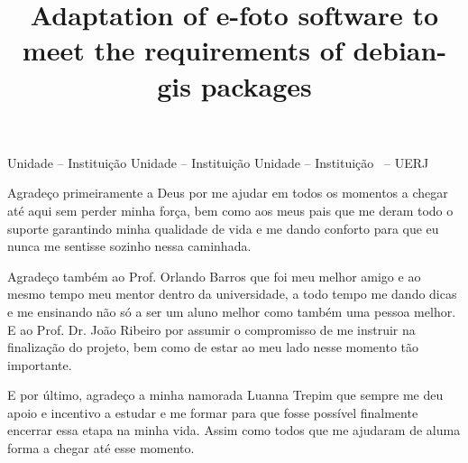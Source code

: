 \documentclass[a4paper,12pt,oneside,onecolumn,final,fleqn]{repUERJ}
\title{Adaptation of e-foto software to meet the requirements of debian-gis packages}
\begin{document}
	
	\frontmatter %
	
	\capa
	\folhaderosto
	\fichacatalografica{}
	\begin{folhadeaprovacao}
		{Unidade -- Instituição}
		{Unidade -- Instituição}
		{Unidade -- Instituição}
		{\UERJunidade \UERJunidadenome\ -- UERJ}
	\end{folhadeaprovacao}
	
	Agradeço primeiramente a Deus por me ajudar em todos os momentos a chegar até aqui sem perder minha força, bem como aos meus pais que me deram todo o suporte garantindo minha qualidade de vida e me dando conforto para que eu nunca me sentisse sozinho nessa caminhada.
	
	Agradeço também ao Prof. Orlando Barros que foi meu melhor amigo e ao mesmo tempo meu mentor dentro da universidade, a todo tempo me dando dicas e me ensinando não só a ser um aluno melhor como também uma pessoa melhor. E ao Prof. Dr. João Ribeiro por assumir o compromisso de me instruir na finalização do projeto, bem como de estar ao meu lado nesse momento tão importante.
	
	E por último, agradeço a minha namorada Luanna Trepim que sempre me deu apoio e incentivo a estudar e me formar para que fosse possível finalmente encerrar essa etapa na minha vida. Assim como todos que me ajudaram de aluma forma a chegar até esse momento.
	\pretextualchapter{}
	\vfill
	
\end{document}
